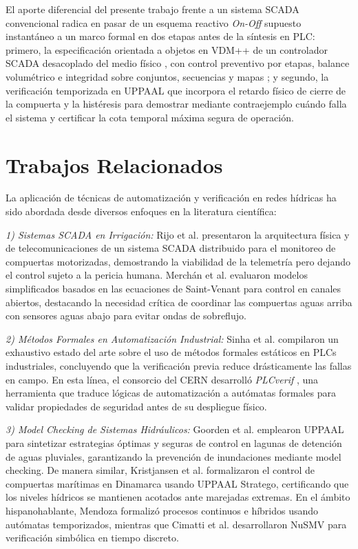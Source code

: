 \documentclass[conference]{IEEEtran}
\begin{document}
El aporte diferencial del presente trabajo frente a un sistema SCADA convencional radica en pasar de un esquema reactivo \textit{On-Off} supuesto instantáneo a un marco formal en dos etapas antes de la síntesis en PLC: primero, la especificación orientada a objetos en VDM++ \cite{larsen2010vdmmanual} de un controlador SCADA desacoplado del medio físico \cite{fitzgerald2010collaborative}, con control preventivo por etapas, balance volumétrico e integridad sobre conjuntos, secuencias y mapas \cite{bowen1994seven}; y segundo, la verificación temporizada en UPPAAL \cite{behrmann2004tutorial,bengtsson2004timed} que incorpora el retardo físico de cierre de la compuerta y la histéresis para demostrar mediante contraejemplo cuándo falla el sistema y certificar la cota temporal máxima segura de operación.

\section{Trabajos Relacionados}
La aplicación de técnicas de automatización y verificación en redes hídricas ha sido abordada desde diversos enfoques en la literatura científica:

\textit{1) Sistemas SCADA en Irrigación:} Rijo et al. \cite{rijo2005design} presentaron la arquitectura física y de telecomunicaciones de un sistema SCADA distribuido para el monitoreo de compuertas motorizadas, demostrando la viabilidad de la telemetría pero dejando el control sujeto a la pericia humana. Merchán et al. \cite{merchan2019evaluacion} evaluaron modelos simplificados basados en las ecuaciones de Saint-Venant para control en canales abiertos, destacando la necesidad crítica de coordinar las compuertas aguas arriba con sensores aguas abajo para evitar ondas de sobreflujo.

\textit{2) Métodos Formales en Automatización Industrial:} Sinha et al. \cite{sinha2019survey} compilaron un exhaustivo estado del arte sobre el uso de métodos formales estáticos en PLCs industriales, concluyendo que la verificación previa reduce drásticamente las fallas en campo. En esta línea, el consorcio del CERN desarrolló \textit{PLCverif} \cite{lopezmiguel2021plcverif}, una herramienta que traduce lógicas de automatización a autómatas formales para validar propiedades de seguridad antes de su despliegue físico.

\textit{3) Model Checking de Sistemas Hidráulicos:} Goorden et al. \cite{goorden2021learning} emplearon UPPAAL para sintetizar estrategias óptimas y seguras de control en lagunas de detención de aguas pluviales, garantizando la prevención de inundaciones mediante model checking. De manera similar, Kristjansen et al. \cite{kristjansen2022safe} formalizaron el control de compuertas marítimas en Dinamarca usando UPPAAL Stratego, certificando que los niveles hídricos se mantienen acotados ante marejadas extremas. En el ámbito hispanohablante, Mendoza \cite{mendoza2014enfoque} formalizó procesos continuos e híbridos usando autómatas temporizados, mientras que Cimatti et al. \cite{cimatti2002nusmv} desarrollaron NuSMV para verificación simbólica en tiempo discreto.
\end{document}
